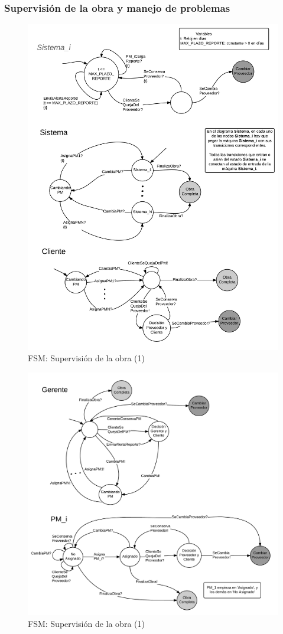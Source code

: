 		\subsubsection{Supervisión de la obra y manejo de problemas}

\begin{figure}[H]
\centering
\includegraphics[width=0.8\linewidth]{diag/nuevos/fsm-obra1.png}
\caption{FSM: Supervisión de la obra (1)}
\label{fsm-firmcont1}
\end{figure}

\begin{figure}[H]
\centering
\includegraphics[width=0.8\linewidth]{diag/nuevos/fsm-obra2.png}
\caption{FSM: Supervisión de la obra (1)}
\label{fsm-firmcont2}
\end{figure}

